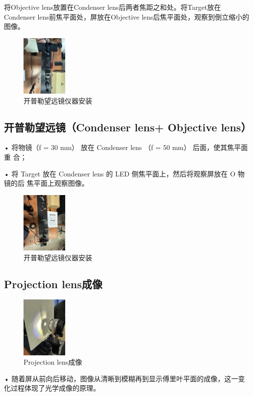 \documentclass{ctexart}
\begin{document}
将Objective lens放置在Condenser lens后两者焦距之和处。将Target放在Condenser lens前焦平面处，屏放在Objective lens后焦平面处，观察到倒立缩小的图像。

\begin{figure}[htbp]
  \centering
  \includegraphics[width=0.2\textwidth,height=0.3\textwidth]{pictures/微信图片_20241010200924.jpg}
  \caption{开普勒望远镜仪器安装}
\end{figure} 

\subsection{开普勒望远镜（Condenser lens+ Objective lens）}
• 将物镜（f = 30 mm） 放在 Condenser lens （f = 50 mm） 后面，使其焦平面重
合；

• 将 Target 放在 Condenser lens 的 LED 侧焦平面上，然后将观察屏放在 O 物镜的后
焦平面上观察图像。
\begin{figure}[htbp]
  \centering
  \includegraphics[width=0.2\textwidth,height=0.3\textwidth]{pictures/微信图片_20241010200942.jpg}
  \caption{开普勒望远镜仪器安装}
\end{figure} 
\subsection{Projection lens成像}
\begin{figure}[htbp]
  \centering
  \includegraphics[width=0.2\textwidth,height=0.3\textwidth]{pictures/微信图片_20241010200955.jpg}
  \caption{Projection lens成像}
\end{figure} 
• 随着屏从前向后移动，图像从清晰到模糊再到显示傅里叶平面的成像，这一变化过程体现了光学成像的原理。
\end{document}
